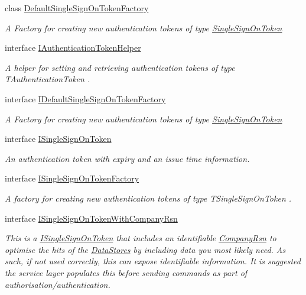 \begin{DoxyCompactItemize}
class \hyperlink{classCqrs_1_1Authentication_1_1DefaultSingleSignOnTokenFactory}{Default\+Single\+Sign\+On\+Token\+Factory}
\begin{DoxyCompactList}\small\item\em A Factory for creating new authentication tokens of type \hyperlink{classCqrs_1_1Authentication_1_1SingleSignOnToken}{Single\+Sign\+On\+Token} \end{DoxyCompactList}\item 
interface \hyperlink{interfaceCqrs_1_1Authentication_1_1IAuthenticationTokenHelper}{I\+Authentication\+Token\+Helper}
\begin{DoxyCompactList}\small\item\em A helper for setting and retrieving authentication tokens of type {\itshape T\+Authentication\+Token} . \end{DoxyCompactList}\item 
interface \hyperlink{interfaceCqrs_1_1Authentication_1_1IDefaultSingleSignOnTokenFactory}{I\+Default\+Single\+Sign\+On\+Token\+Factory}
\begin{DoxyCompactList}\small\item\em A Factory for creating new authentication tokens of type \hyperlink{classCqrs_1_1Authentication_1_1SingleSignOnToken}{Single\+Sign\+On\+Token} \end{DoxyCompactList}\item 
interface \hyperlink{interfaceCqrs_1_1Authentication_1_1ISingleSignOnToken}{I\+Single\+Sign\+On\+Token}
\begin{DoxyCompactList}\small\item\em An authentication token with expiry and an issue time information. \end{DoxyCompactList}\item 
interface \hyperlink{interfaceCqrs_1_1Authentication_1_1ISingleSignOnTokenFactory}{I\+Single\+Sign\+On\+Token\+Factory}
\begin{DoxyCompactList}\small\item\em A factory for creating new authentication tokens of type {\itshape T\+Single\+Sign\+On\+Token} . \end{DoxyCompactList}\item 
interface \hyperlink{interfaceCqrs_1_1Authentication_1_1ISingleSignOnTokenWithCompanyRsn}{I\+Single\+Sign\+On\+Token\+With\+Company\+Rsn}
\begin{DoxyCompactList}\small\item\em This is a \hyperlink{interfaceCqrs_1_1Authentication_1_1ISingleSignOnToken}{I\+Single\+Sign\+On\+Token} that includes an identifiable \hyperlink{interfaceCqrs_1_1Authentication_1_1ISingleSignOnTokenWithCompanyRsn_a26ffa6ca2e583f0ecc440b68fe3edd52_a26ffa6ca2e583f0ecc440b68fe3edd52}{Company\+Rsn} to optimise the hits of the \hyperlink{}{Data\+Stores} by including data you most likely need. As such, if not used correctly, this can expose identifiable information. It is suggested the service layer populates this before sending commands as part of authorisation/authentication. \end{DoxyCompactList}\item 

\end{DoxyCompactItemize}
